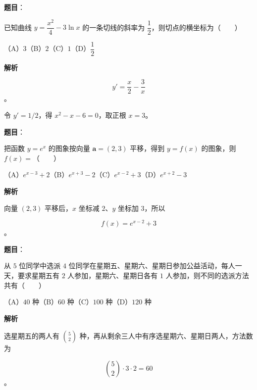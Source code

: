 \begin{answer}

\textbf{题目}：

已知曲线 $y=\dfrac{x^2}{4}-3\ln x$ 的一条切线的斜率为 $\dfrac12$，则切点的横坐标为\mbox{（　　）}

（A）$3$\quad（B）$2$\quad（C）$1$\quad（D）$\dfrac12$

\textbf{解析}

\nopagebreak[4]
\[
y'=\frac{x}{2}-\frac3x
\]
。

令 $y'=1/2$，得 $x^2-x-6=0$，取正根 $x=3$。


\end{answer}
\begin{answer}

\textbf{题目}：

把函数 $y=e^x$ 的图象按向量 $\boldsymbol a=(2,3)$ 平移，得到 $y=f(x)$ 的图象，则 $f(x)=$\mbox{（　　）}

（A）$e^{x-3}+2$\quad（B）$e^{x+3}-2$\quad（C）$e^{x-2}+3$\quad（D）$e^{x+2}-3$

\textbf{解析}

向量 $(2,3)$ 平移后，$x$ 坐标减 $2$、$y$ 坐标加 $3$，所以

\nopagebreak[4]
\[
f(x)=e^{x-2}+3
\]
。


\end{answer}
\begin{answer}

\textbf{题目}：

从 $5$ 位同学中选派 $4$ 位同学在星期五、星期六、星期日参加公益活动，每人一天，要求星期五有 $2$ 人参加，星期六、星期日各有 $1$ 人参加，则不同的选派方法共有\mbox{（　　）}

（A）$40$ 种\quad（B）$60$ 种\quad（C）$100$ 种\quad（D）$120$ 种

\textbf{解析}

选星期五的两人有 $\binom52$ 种，再从剩余三人中有序选星期六、星期日两人，方法数为

\nopagebreak[4]
\[
\binom52\cdot3\cdot2=60
\]
。


\end{answer}
